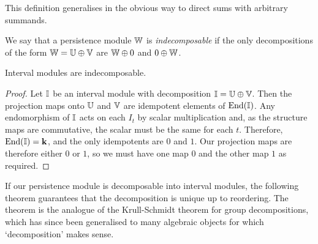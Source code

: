 This definition generalises in the obvious way to direct sums with arbitrary summands.

We say that a persistence module $\mathbb{W}$ is \emph{indecomposable} if the only decompositions of the form $\mathbb{W} = \mathbb{U} \oplus \mathbb{V}$ are $\mathbb{W} \oplus 0$ and $0 \oplus \mathbb{W}$.

\begin{proposition}
Interval modules are indecomposable.
\end{proposition}
\begin{proof}
Let $\mathbb{I}$ be an interval module with decomposition $\mathbb{I} = \mathbb{U} \oplus \mathbb{V}$. Then the projection maps onto $\mathbb{U}$ and $\mathbb{V}$ are idempotent elements of $\operatorname{End}(\mathbb{I})$. Any endomorphism of $\mathbb{I}$ acts on each $I_t$ by scalar multiplication and, as the structure maps are commutative, the scalar must be the same for each $t$. Therefore, $\operatorname{End}(\mathbb{I}) = \mathbf{k}$, and the only idempotents are $0$ and $1$. Our projection maps are therefore either $0$ or $1$, so we must have one map $0$ and the other map $1$ as required.
\end{proof}

If our persistence module is decomposable into interval modules, the following theorem guarantees that the decomposition is unique up to reordering. The theorem is the analogue of the Krull-Schmidt theorem \cite{azumaya1950corrections} for group decompositions, which has since been generalised to many algebraic objects for which `decomposition' makes sense.

